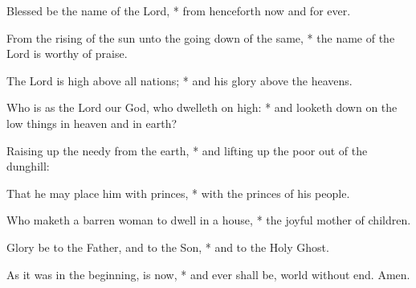 ﻿\item Blessed be the name of the Lord, * from henceforth now and for ever.
\item  From the rising of the sun unto the going down of the same, * the name of the Lord is worthy of praise.
\item  The Lord is high above all nations; * and his glory above the heavens.
\item  Who is as the Lord our God, who dwelleth on high: * and looketh down on the low things in heaven and in earth?
\item  Raising up the needy from the earth, * and lifting up the poor out of the dunghill:
\item That he may place him with princes, * with the princes of his people.
\item Who maketh a barren woman to dwell in a house, * the joyful mother of children.
\item Glory be to the Father, and to the Son, * and to the Holy Ghost.
\item As it was in the beginning, is now, * and ever shall be, world without end. Amen.
